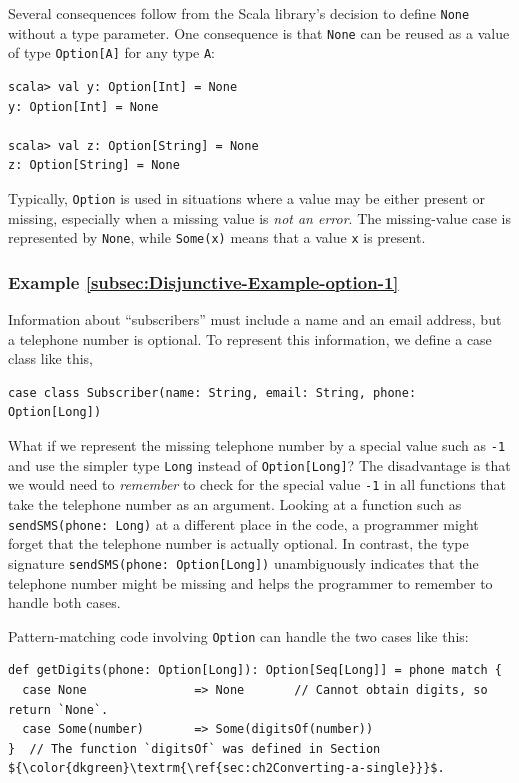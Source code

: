 Several consequences follow from the Scala library\textsf{'}s decision to define
\lstinline!None! without a type parameter. One consequence is that
\lstinline!None! can be reused as a value of type \lstinline!Option[A]!
for any type \lstinline!A!:
\begin{lstlisting}
scala> val y: Option[Int] = None
y: Option[Int] = None

scala> val z: Option[String] = None
z: Option[String] = None
\end{lstlisting}

Typically, \lstinline!Option! is used in situations where a value
may be either present or missing, especially when a missing value
is \emph{not an error}. The missing-value case is represented by \lstinline!None!,
while \lstinline!Some(x)! means that a value \lstinline!x! is present.

\subsubsection{Example \label{subsec:Disjunctive-Example-option-1}\ref{subsec:Disjunctive-Example-option-1}}

Information about \textsf{``}subscribers\textsf{''} must include a name and an email
address, but a telephone number is optional. To represent this information,
we define a case class like this,
\begin{lstlisting}
case class Subscriber(name: String, email: String, phone: Option[Long])
\end{lstlisting}
What if we represent the missing telephone number by a special value
such as \lstinline!-1! and use the simpler type \lstinline!Long!
instead of \lstinline!Option[Long]!? The disadvantage is that we
would need to \emph{remember} to check for the special value \lstinline!-1!
in all functions that take the telephone number as an argument. Looking
at a function such as \lstinline!sendSMS(phone: Long)! at a different
place in the code, a programmer might forget that the telephone number
is actually optional. In contrast, the type signature \lstinline!sendSMS(phone: Option[Long])!
unambiguously indicates that the telephone number might be missing
and helps the programmer to remember to handle both cases.

Pattern-matching code involving \lstinline!Option! can handle the
two cases like this:
\begin{lstlisting}[mathescape=true]
def getDigits(phone: Option[Long]): Option[Seq[Long]] = phone match {
  case None               => None       // Cannot obtain digits, so return `None`.
  case Some(number)       => Some(digitsOf(number))
}  // The function `digitsOf` was defined in Section ${\color{dkgreen}\textrm{\ref{sec:ch2Converting-a-single}}}$.
\end{lstlisting}

